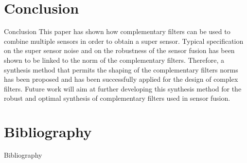 \documentclass[t]{clean-beamer}
\begin{document}
\section{Conclusion}
\label{sec:org425430e}
\label{sec:conclusion}
\begin{frame}[label={sec:org3cfbc70}]{Conclusion}
This paper has shown how complementary filters can be used to combine multiple sensors in order to obtain a super sensor.
Typical specification on the super sensor noise and on the robustness of the sensor fusion has been shown to be linked to the norm of the complementary filters.
Therefore, a synthesis method that permits the shaping of the complementary filters norms has been proposed and has been successfully applied for the design of complex filters.
Future work will aim at further developing this synthesis method for the robust and optimal synthesis of complementary filters used in sensor fusion.
\end{frame}
\section{Bibliography}
\label{sec:org404b871}
\begin{frame}[label={sec:org03eccb0}]{Bibliography}


\end{frame}
\end{document}
